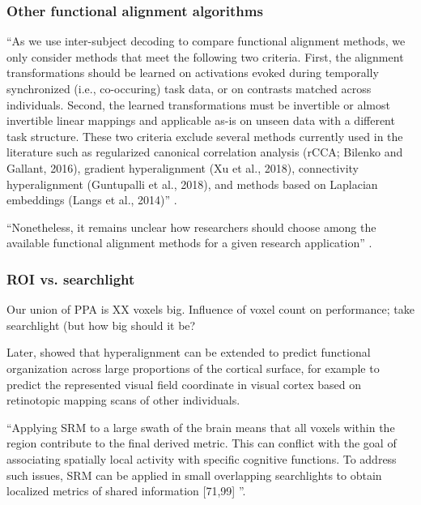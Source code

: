 \subsubsection{Other functional alignment algorithms}



``As we use inter-subject decoding to compare functional alignment methods, we
only consider methods that meet the following two criteria. First, the alignment
transformations should be learned on activations evoked during temporally
synchronized (i.e., co-occuring) task data, or on contrasts matched across
individuals. Second, the learned transformations must be invertible or almost
invertible linear mappings and applicable as-is on unseen data with a different
task structure. These two criteria exclude several methods currently used in the
literature such as regularized canonical correlation analysis (rCCA; Bilenko and
Gallant, 2016), gradient hyperalignment (Xu et al., 2018), connectivity
hyperalignment (Guntupalli et al., 2018), and methods based on Laplacian
embeddings (Langs et al., 2014)'' \citep{bazeille2021empirical}.

``Nonetheless, it remains unclear how researchers should choose among the
available functional alignment methods for a given research application''
\citep{bazeille2021empirical}.


\subsubsection{ROI vs. searchlight}



%
Our union of PPA is XX voxels big.
%
Influence of voxel count on performance; take searchlight (but how big should it
be?

Later, \citet{guntupalli2016model} showed that hyperalignment can be extended to
predict functional organization across large proportions of the cortical
surface, for example to predict the represented visual field coordinate in
visual cortex based on retinotopic mapping scans of other individuals.

``Applying SRM to a large swath of the brain means that all voxels within the
region contribute to the final derived metric. This can conflict with the goal
of associating spatially local activity with specific cognitive functions. To
address such issues, SRM can be applied in small overlapping searchlights to
obtain localized metrics of shared information [71,99]
\citep{cohen2017computational}''.

